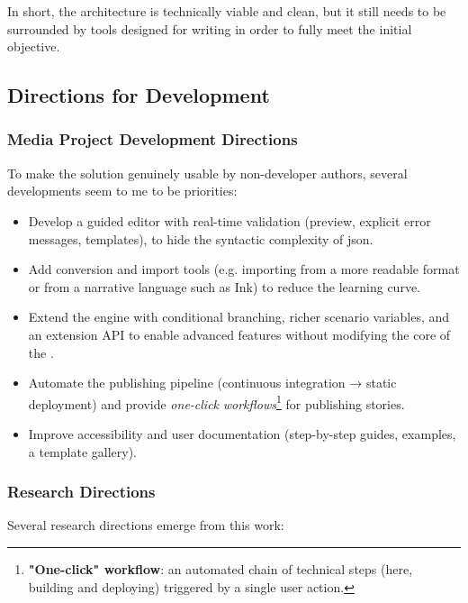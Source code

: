 In short, the architecture is technically viable and clean, but it still needs to be surrounded by tools designed for writing in order to fully meet the initial objective.


\subsection{Directions for Development}

\subsubsection{Media Project Development Directions}
To make the solution genuinely usable by non-developer authors, several developments seem to me to be priorities:

\begin{itemize}
    \item Develop a guided editor with real-time validation (preview, explicit error messages, templates), to hide the syntactic complexity of \gls{json}.
    \item Add conversion and import tools (e.g. importing from a more readable format or from a narrative language such as Ink) to reduce the learning curve.
    \item Extend the engine with conditional branching, richer scenario variables, and an extension API to enable advanced features without modifying the core of the .
    \item Automate the publishing pipeline (continuous integration → static deployment) and provide \textit{one-click} \textit{workflows}\footnote{\textbf{"One-click" workflow}: an automated chain of technical steps (here, building and deploying) triggered by a single user action.} for publishing stories.
    \item Improve accessibility and user documentation (step-by-step guides, examples, a template gallery).
\end{itemize}

\clearpage


\subsubsection{Research Directions}
Several research directions emerge from this work:

